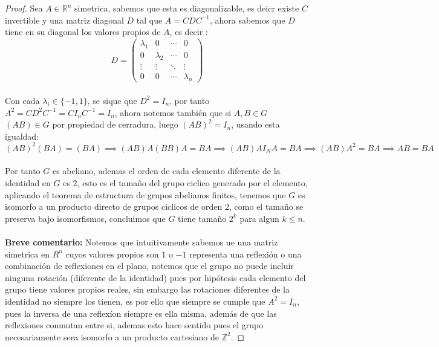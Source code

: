 \documentclass[11pt]{article}
\newcommand{\R}{\mathbb{R}}
\newcommand{\Z}{\mathbb{Z}}
\begin{document}
\begin{proof}
    Sea $A\in \R^n$ simetrica, sabemos que esta es diagonalizable, es deicr existe $C$ invertible y una matriz diagonal $D$ tal que $A=CDC^{-1}$, ahora sabemos que $D$ tiene en su diagonal los valores propios de $A$, es decir :
    \begin{equation*}
        D=\begin{pmatrix}
            \lambda_1 & 0 & \cdots & 0\\
            0 & \lambda_2 & \cdots & 0\\
            \vdots & \vdots & \ddots & \vdots\\
            0 & 0 & \cdots & \lambda_n
        \end{pmatrix}
    \end{equation*}\,\\
    Con cada $\lambda_i\in\{-1,1\}$, se sique que $D^2=I_n$, por tanto $A^2=CD^2C^{-1}=CI_nC^{-1}=I_n$, ahora
    notemos tambi\'en que si $A,B\in G$ $(AB)\in G$ por propiedad de cerradura, luego $(AB)^2=I_n$, usando esta igualdad:
    \begin{equation*}
        (AB)^2(BA)=(BA)\implies (AB)A(BB)A=BA\implies (AB)A I_N A=BA\implies (AB)A^2=BA \implies AB=BA
    \end{equation*}\,\\
    Por tanto $G$ es abeliano, ademas el orden de cada elemento diferente de la identidad en $G$ es $2$, esto es el tamaño del grupo ciclico generado por el elemento, aplicando
    el teorema de estructura de grupos abelianos finitos, tenemos que $G$ es isomorfo a un producto directo de grupos ciclicos de orden $2$, como el tamaño se preserva bajo isomorfismos,
    concluimos que $G$ tiene tamaño $2^k$ para algun $k\leq n$.\,\\
    \,\\
    \textbf{Breve comentario:} Notemos que intuitivamente sabemos ue una matriz simetrica en $R^n$ cuyos valores propios son $1$ o $-1$ representa una reflexi\'on o una combinaci\'on de reflexiones en el plano, notemos que el grupo no puede incluir ninguna rotaci\'on (diferente de la identidad) pues por hip\'otesis cada elemento del grupo tiene valores propios reales, sin embargo las rotaciones diferentes de la identidad no siempre los tienen, es por ello que siempre
    se cumple que $A^2=I_n$, pues la inversa de una reflex\'ion siempre es ella misma, adem\'as de que las reflexiones conmutan entre si, ademas esto hace sentido pues el grupo necesariamente sera isomorfo a un producto cartesiano de $\Z^2$.
\end{proof}
\newpage
\end{document}
